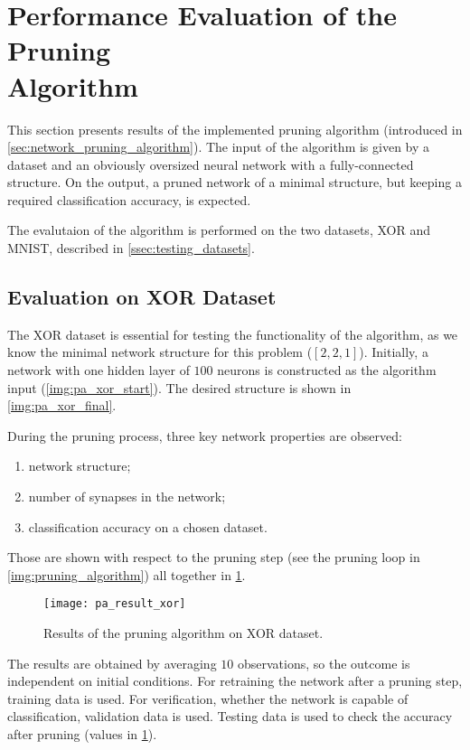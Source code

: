 \section[Performance Evaluation of the Pruning Algorithm]{Performance Evaluation of the Pruning \\Algorithm} \label{sec:pruning_algorithm_results}
This section presents results of the implemented pruning algorithm (introduced in \cref{sec:network_pruning_algorithm}). The input of the algorithm is given by a dataset and an obviously oversized neural network with a fully-connected structure. On the output, a pruned network of a minimal structure, but keeping a required classification accuracy, is expected.

The evalutaion of the algorithm is performed on the two datasets, XOR and MNIST, described in \cref{ssec:testing_datasets}.

\subsection{Evaluation on XOR Dataset} \label{ssec:evaluation_on_xor}
The XOR dataset is essential for testing the functionality of the algorithm, as we know the minimal network structure for this problem ($ [2, 2, 1] $). Initially, a network with one hidden layer of $ 100 $ neurons is constructed as the algorithm input (\cref{img:pa_xor_start}). The desired structure is shown in \cref{img:pa_xor_final}.

During the pruning process, three key network properties are observed:
\begin{enumerate}
\item network structure;
\item number of synapses in the network;
\item classification accuracy on a chosen dataset.
\end{enumerate}

Those are shown with respect to the pruning step (see the pruning loop in \cref{img:pruning_algorithm}) all together in \cref{fig:pa_result_xor}.

\begin{figure}[H]
  \centering
  \texttt{[image: pa\_result\_xor]}
  \caption{Results of the pruning algorithm on XOR dataset.}
  \label{fig:pa_result_xor}
\end{figure}

The results are obtained by averaging $ 10 $ observations, so the outcome is independent on initial conditions. For retraining the network after a pruning step, training data is used. For verification, whether the network is capable of classification, validation data is used. Testing data is used to check the accuracy after pruning (values in \cref{fig:pa_result_xor}).

